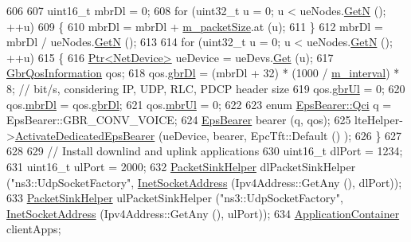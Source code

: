 \begin{DoxyCode}
606 
607   uint16\_t mbrDl = 0;
608   \textcolor{keywordflow}{for} (uint32\_t u = 0; u < ueNodes.\hyperlink{classns3_1_1NodeContainer_aed647ac56d0407a7706aba02eb44b951}{GetN} (); ++u)
609     \{
610       mbrDl = mbrDl + \hyperlink{classLenaTdTbfqFfMacSchedulerTestCase2_a1d0fb560aff325ef9ba8635e39ce3721}{m\_packetSize}.at (u);
611     \}
612   mbrDl = mbrDl / ueNodes.\hyperlink{classns3_1_1NodeContainer_aed647ac56d0407a7706aba02eb44b951}{GetN} (); 
613 
614   \textcolor{keywordflow}{for} (uint32\_t u = 0; u < ueNodes.\hyperlink{classns3_1_1NodeContainer_aed647ac56d0407a7706aba02eb44b951}{GetN} (); ++u)
615     \{
616       \hyperlink{classns3_1_1Ptr}{Ptr<NetDevice>} ueDevice = ueDevs.\hyperlink{classns3_1_1NetDeviceContainer_a677d62594b5c9d2dea155cc5045f4d0b}{Get} (u);
617       \hyperlink{structns3_1_1GbrQosInformation}{GbrQosInformation} qos;
618       qos.\hyperlink{structns3_1_1GbrQosInformation_a70b6106f5918d464d296bc23415ec801}{gbrDl} = (mbrDl + 32) * (1000 / \hyperlink{classLenaTdTbfqFfMacSchedulerTestCase2_a4c505e022817f9759194c657d194414d}{m\_interval}) * 8;  \textcolor{comment}{// bit/s, considering IP, UDP,
       RLC, PDCP header size}
619       qos.\hyperlink{structns3_1_1GbrQosInformation_a8027f26c8fd5fd643d5af7a6a879860f}{gbrUl} = 0;
620       qos.\hyperlink{structns3_1_1GbrQosInformation_ac059dd3ad95475e8df63e52d9c2235e7}{mbrDl} = qos.\hyperlink{structns3_1_1GbrQosInformation_a70b6106f5918d464d296bc23415ec801}{gbrDl};
621       qos.\hyperlink{structns3_1_1GbrQosInformation_afce406e4f92771305075ace6cfe83e36}{mbrUl} = 0;
622   
623       \textcolor{keyword}{enum} \hyperlink{structns3_1_1EpsBearer_aecf0c67109c5eb4ec0b07226fff5885e}{EpsBearer::Qci} q = EpsBearer::GBR\_CONV\_VOICE;
624       \hyperlink{structns3_1_1EpsBearer}{EpsBearer} bearer (q, qos);
625       lteHelper->\hyperlink{classns3_1_1LteHelper_af28041edd4c96bde1a2e07c90e363dcc}{ActivateDedicatedEpsBearer} (ueDevice, bearer, EpcTft::Default ()
      );  
626     \}
627 
628 
629   \textcolor{comment}{// Install downlind and uplink applications}
630   uint16\_t dlPort = 1234;
631   uint16\_t ulPort = 2000;
632   \hyperlink{classns3_1_1PacketSinkHelper}{PacketSinkHelper} dlPacketSinkHelper (\textcolor{stringliteral}{"ns3::UdpSocketFactory"}, 
      \hyperlink{classns3_1_1InetSocketAddress}{InetSocketAddress} (Ipv4Address::GetAny (), dlPort));
633   \hyperlink{classns3_1_1PacketSinkHelper}{PacketSinkHelper} ulPacketSinkHelper (\textcolor{stringliteral}{"ns3::UdpSocketFactory"}, 
      \hyperlink{classns3_1_1InetSocketAddress}{InetSocketAddress} (Ipv4Address::GetAny (), ulPort));
634   \hyperlink{classns3_1_1ApplicationContainer}{ApplicationContainer} clientApps;

\end{DoxyCode}
